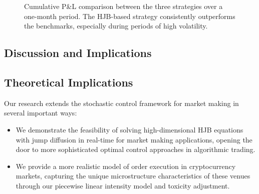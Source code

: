 \documentclass[twocolumn,11pt]{IEEEtran}  %
\begin{document}
\begin{onecolumn}
\begin{onecolumn}
\begin{figure}[h]
\caption{Cumulative P\&L comparison between the three strategies over a one-month period. The HJB-based strategy consistently outperforms the benchmarks, especially during periods of high volatility.}
\label{fig:pnl_comparison}
\end{figure}
\end{onecolumn}
\begin{twocolumn}
\section{Discussion and Implications}

\subsection{Theoretical Implications}

Our research extends the stochastic control framework for market making in several important ways:

\begin{itemize}
    \item We demonstrate the feasibility of solving high-dimensional HJB equations with jump diffusion in real-time for market making applications, opening the door to more sophisticated optimal control approaches in algorithmic trading.
    
    \item We provide a more realistic model of order execution in cryptocurrency markets, capturing the unique microstructure characteristics of these venues through our piecewise linear intensity model and toxicity adjustment.
    

\end{itemize}
\end{twocolumn}
\end{onecolumn}
\end{document}
